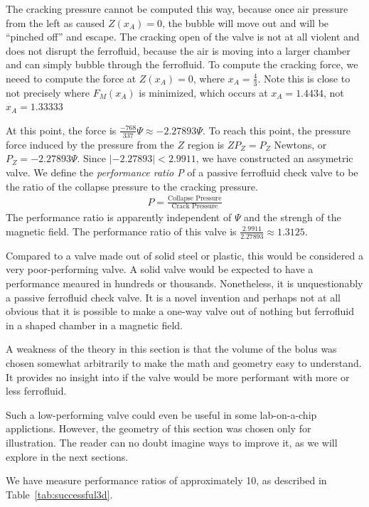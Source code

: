 \documentclass{asme2ej}
\begin{document}
The cracking pressure cannot be computed this way, because once
air pressure from the left as caused $Z(x_A) = 0$, the bubble will move
out and will be ``pinched off'' and escape.
The cracking open of the valve is not at all violent and does not
disrupt the ferrofluid, because the air is moving into a larger
chamber and can simply bubble through the ferrofluid.
To compute the cracking force, we neeed to compute the force at $Z(x_A) = 0$,
where $x_A = \frac{4}{3}$. Note this is close to not precisely where $F_M(x_A)$
is minimized, which occurs at $x_A = 1.4434$, not $x_A = 1.33333$

At this point, the force is $\frac{-768}{337}  \Psi \approx -2.27893  \Psi$.
To reach this point, the pressure force induced by the pressure from the $Z$
region is $Z P_Z = P_Z $ Newtons, or $P_Z = -2.27893  \Psi$.
Since $|-2.27893| < 2.9911 $, we have constructed an assymetric valve.
We define the {\em performance ratio P} of a passive ferrofluid check valve
to be the ratio of the collapse pressure to the cracking pressure.
\begin{align}
  P = \frac{\text{Collapse Pressure}}{\text{Crack Pressure}}
\end{align}
The performance ratio is apparently independent of $\Psi$ and the strengh
of the magnetic field.
The performance ratio of this valve is $\frac{2.9911}{2.27893} \approx 1.3125$.

Compared to a valve made out of solid steel or plastic, this would be considered
a very poor-performing valve. A solid valve would be expected to have a performance
meaured in hundreds or thousands.
Nonetheless, it is unquestionably a
passive ferrofluid check valve.
It is a novel invention and perhaps not at all obvious that it is possible to make
a one-way valve out of nothing but ferrofluid in a shaped chamber in a magnetic field.

A weakness of the theory in this section is that the
volume of the bolus was chosen somewhat arbitrarily to
make the math and geometry easy to understand.
It provides no insight into if the valve would be more performant
with more or less ferrofluid.

Such a low-performing valve could even be useful in some lab-on-a-chip applictions.
However, the geometry of this section was chosen only for illustration.
The reader can no doubt imagine ways to improve it, as we will explore in the
next sections.

We have measure performance ratios of approximately 10, as described
in Table~\ref{tab:successful3d}.
\end{document}
